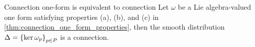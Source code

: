 \begin{theorem}{Connection one-form is equivalent to connection}{}
    Let \(\omega\) be a Lie algebra-valued one form satisfying properties (a), (b), and (c) in \cref{thm:connection_one_form_properties}, then the smooth distribution \(\Delta = \left\{\ker \omega_p\right\}_{p \in P}\) is a connection.
\end{theorem}

